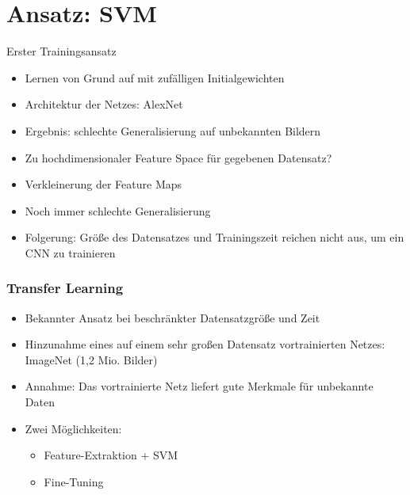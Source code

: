\documentclass[t]{beamer}
\begin{document}
\section{Ansatz: SVM}

\begin{frame}{Erster Trainingsansatz}
\bigskip
\begin{itemize}
\item Lernen von Grund auf mit zuf\"alligen Initialgewichten
\item Architektur der Netzes: AlexNet
\item Ergebnis: schlechte Generalisierung auf unbekannten Bildern
\item Zu hochdimensionaler Feature Space f\"ur gegebenen Datensatz?
\item Verkleinerung der Feature Maps
\item Noch immer schlechte Generalisierung
\item Folgerung: Gr\"o{\ss}e des Datensatzes und Trainingszeit reichen nicht aus, um ein CNN zu trainieren
\end{itemize}
\end{frame}


\begin{frame}
 \frametitle{Transfer Learning}
\bigskip
  \begin{itemize}
  \item Bekannter Ansatz bei beschr\"ankter Datensatzgr\"o{\ss}e und Zeit %
  \item Hinzunahme eines auf einem sehr gro{\ss}en Datensatz vortrainierten Netzes: ImageNet (1,2 Mio. Bilder)
  \item Annahme: Das vortrainierte Netz liefert gute Merkmale f\"ur unbekannte Daten
  \item Zwei M\"oglichkeiten:
	\begin{itemize} %
		\item Feature-Extraktion + SVM
		\item Fine-Tuning  
	\end{itemize}
  \end{itemize}
\end{frame}
\end{document}
